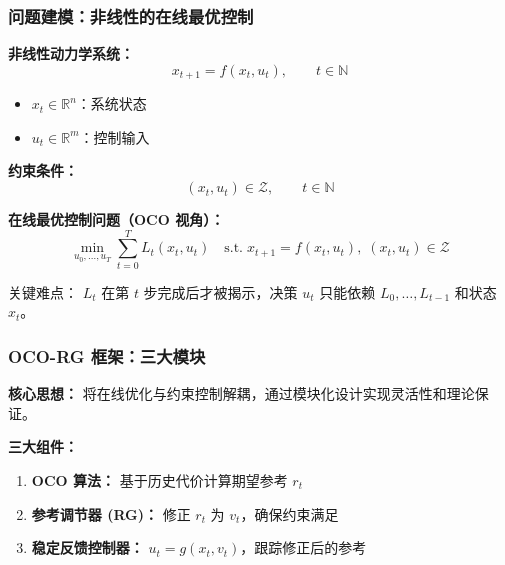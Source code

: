 \documentclass{ltx-talk}
\begin{document}
\begin{frame}
\frametitle{问题建模：非线性的在线最优控制}

\textbf{非线性动力学系统：}
\[
    x_{t+1} = f(x_t, u_t), \qquad t \in \mathbb{N}
\]
\begin{itemize}
    \item $x_t \in \mathbb{R}^n$：系统状态
    \item $u_t \in \mathbb{R}^m$：控制输入
\end{itemize}

\textbf{约束条件：}
\[
    (x_t, u_t) \in \mathcal{Z}, \qquad t \in \mathbb{N}
\]

\textbf{在线最优控制问题（OCO 视角）：}
\[
    \min_{u_0,\dots,u_T} \sum_{t=0}^{T} L_t(x_t, u_t) \quad \text{s.t.} \; x_{t+1} = f(x_t, u_t),\; (x_t, u_t) \in \mathcal{Z}
\]

\small
\textcolor{myblue}{关键难点：} $L_t$ 在第 $t$ 步完成后才被揭示，决策 $u_t$ 只能依赖 $L_0,\dots,L_{t-1}$ 和状态 $x_t$。
\end{frame}

\begin{frame}
\frametitle{OCO-RG 框架：三大模块}

\textbf{核心思想：} 将在线优化与约束控制\textcolor{myred}{解耦}，通过模块化设计实现灵活性和理论保证。

\begin{center}
\end{center}

\vspace{3mm}
\textbf{三大组件：}
\begin{enumerate}
    \item \textbf{OCO 算法：} 基于历史代价计算期望参考 $r_t$
    \item \textbf{参考调节器 (RG)：} 修正 $r_t$ 为 $v_t$，确保约束满足
    \item \textbf{稳定反馈控制器：} $u_t = g(x_t, v_t)$，跟踪修正后的参考
\end{enumerate}
\end{frame}
\end{document}
